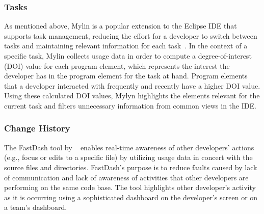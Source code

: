 \subsubsection{Tasks}

As mentioned above, Mylin is a popular extension to the Eclipse IDE that supports task
management, reducing the effort for a developer to switch between
tasks and maintaining relevant information for each
task~\citep{Kersten-Mylyn}. In the context of a specific task, Mylin
collects usage data in order to compute a degree-of-interest (DOI)
value for each program element, which represents the interest the
developer has in the program element for the task at hand. Program elements that a developer interacted with frequently and recently have a higher DOI value. Using these calculated DOI values, Mylyn highlights the elements relevant for the current task and filters unnecessary information from common views in the IDE. 

\subsubsection{Change History}

The FastDash tool by ~\citet{FastDash} enables real-time awareness of other developers'
actions (e.g., focus or edits to a specific file) by utilizing usage
data in concert with the source files and
directories. FastDash's purpose is to reduce faults
caused by lack of communication and lack of awareness of activities
that other developers are performing on the same code base. The tool
highlights other developer's activity as it is occurring using a
sophisticated dashboard on the developer's screen or on a team's dashboard.




